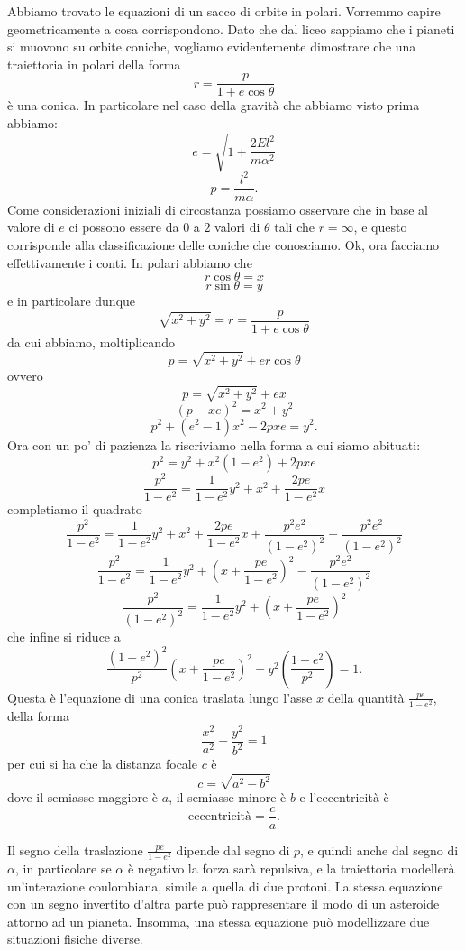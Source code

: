 \documentclass[11pt]{scrartcl}
\begin{document}
	Abbiamo trovato le equazioni di un sacco di orbite in polari. Vorremmo capire geometricamente a cosa corrispondono. Dato che dal liceo sappiamo che i pianeti si muovono su orbite coniche, vogliamo evidentemente dimostrare che una traiettoria in polari della forma
	$$r=\frac{p}{1+e\cos\theta}$$
	è una conica. In particolare nel caso della gravità che abbiamo visto prima abbiamo:
	$$e=\sqrt{1+\frac{2El^2}{m\alpha^2}}$$
	$$p=\frac{l^2}{m\alpha}.$$
	Come considerazioni iniziali di circostanza possiamo osservare che in base al valore di $e$ ci possono essere da $0$ a $2$ valori di $\theta$ tali che $r=\infty$, e questo corrisponde alla classificazione delle coniche che conosciamo. Ok, ora facciamo effettivamente i conti. In polari abbiamo che
	$$r\cos\theta=x$$
	$$r\sin\theta=y$$
	e in particolare dunque
	$$\sqrt{x^2+y^2}=r=\frac{p}{1+e\cos\theta}$$
	da cui abbiamo, moltiplicando
	$$p=\sqrt{x^2+y^2}+er\cos\theta$$
	ovvero
	$$p=\sqrt{x^2+y^2}+ex$$
	$$\left(p-xe\right)^2=x^2+y^2$$
	$$p^2+(e^2-1)x^2-2pxe=y^2.$$
	Ora con un po' di pazienza la riscriviamo nella forma a cui siamo abituati:
	$$p^2=y^2+x^2(1-e^2)+2pxe$$
	$$\frac{p^2}{1-e^2}=\frac{1}{1-e^2}y^2+x^2+\frac{2pe}{1-e^2}x$$
	completiamo il quadrato
	$$\frac{p^2}{1-e^2}=\frac{1}{1-e^2}y^2+x^2+\frac{2pe}{1-e^2}x+\frac{p^2e^2}{\left(1-e^2\right)^2}-\frac{p^2e^2}{\left(1-e^2\right)^2}$$
	$$\frac{p^2}{1-e^2}=\frac{1}{1-e^2}y^2+\left(x+\frac{pe}{1-e^2}\right)^2-\frac{p^2e^2}{\left(1-e^2\right)^2}$$
	$$\frac{p^2}{\left(1-e^2\right)^2}=\frac{1}{1-e^2}y^2+\left(x+\frac{pe}{1-e^2}\right)^2$$
	che infine si riduce a
	$$\boxed{\frac{\left(1-e^2\right)^2}{p^2}\left(x+\frac{pe}{1-e^2}\right)^2+y^2\left(\frac{1-e^2}{p^2}\right)=1}.$$
	Questa è l'equazione di una conica traslata lungo l'asse $x$ della quantità $\frac{pe}{1-e^2}$, della forma
	$$\frac{x^2}{a^2}+\frac{y^2}{b^2}=1$$
	per cui si ha che la distanza focale $c$ è
	$$c=\sqrt{a^2-b^2}$$
	dove il semiasse maggiore è $a$, il semiasse minore è $b$ e l'eccentricità è
	$$\text{eccentricità}=\frac{c}{a}.$$
	\begin{remark}
		Il segno della traslazione $\frac{pe}{1-e^2}$ dipende dal segno di $p$, e quindi anche dal segno di $\alpha$, in particolare se $\alpha$ è negativo la forza sarà repulsiva, e la traiettoria modellerà un'interazione coulombiana, simile a quella di due protoni. La stessa equazione con un segno invertito d'altra parte può rappresentare il modo di un asteroide attorno ad un pianeta. Insomma, una stessa equazione può modellizzare due situazioni fisiche diverse.
	\end{remark}
\end{document}
